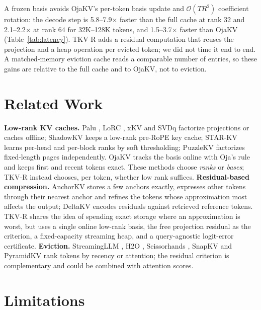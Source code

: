 \documentclass{article}
\begin{document}
A frozen basis avoids OjaKV's per-token basis update and $\mathcal{O}(TR^2)$
coefficient rotation: the decode step is 5.8--7.9$\times$ faster than the full
cache at rank 32 and 2.1--2.2$\times$ at rank 64 for 32K--128K tokens, and
1.5--3.7$\times$ faster than OjaKV (Table~\ref{tab:latency}). TKV-R adds a
residual computation that reuses the projection and a heap operation per
evicted token; we did not time it end to end. A matched-memory eviction cache
reads a comparable number of entries, so these gains are relative to the full
cache and to OjaKV, not to eviction.

\section{Related Work}
\label{sec:related}

\textbf{Low-rank KV caches.} Palu \citep{palu2024}, LoRC \citep{lorc2024},
xKV \citep{xkv2025} and SVDq \citep{svdq2025} factorize projections or caches
offline; ShadowKV \citep{shadowkv2024} keeps a low-rank pre-RoPE key cache;
STAR-KV \citep{starkv2026} learns per-head and per-block ranks by soft
thresholding; PuzzleKV \citep{puzzlekv2026} factorizes fixed-length pages
independently. OjaKV \citep{ojakov2025} tracks the basis online with Oja's rule
and keeps first and recent tokens exact. These methods choose \emph{ranks} or
\emph{bases}; TKV-R instead chooses, per token, whether low rank suffices.
\textbf{Residual-based compression.} AnchorKV \citep{anchorkv2026} stores a
few anchors exactly, expresses other tokens through their nearest anchor and
refines the tokens whose approximation most affects the output; DeltaKV
\citep{deltakv2026} encodes residuals against retrieved reference tokens. TKV-R
shares the idea of spending exact storage where an approximation is worst, but
uses a single online low-rank basis, the free projection residual as the
criterion, a fixed-capacity streaming heap, and a query-agnostic logit-error
certificate. \textbf{Eviction.} StreamingLLM \citep{streamingllm2023}, H2O
\citep{h2o2023}, Scissorhands \citep{scissorhands2023}, SnapKV
\citep{snapkv2024} and PyramidKV \citep{pyramidkv2024} rank tokens by recency or
attention; the residual criterion is complementary and could be combined with
attention scores.

\section{Limitations}
\label{sec:limitations}
\end{document}
